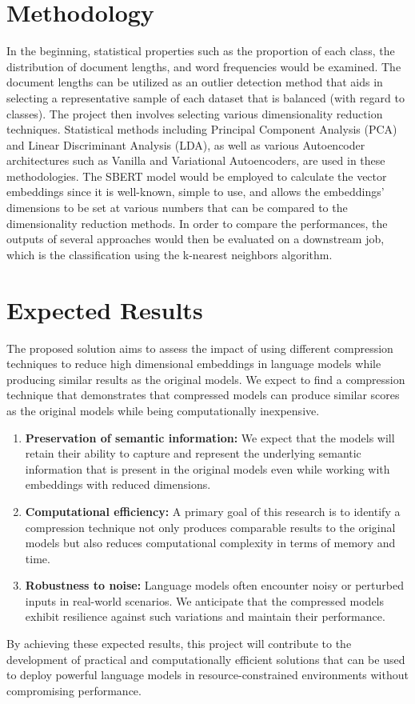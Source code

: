 \documentclass{article}
\begin{document}
\section{Methodology}
In the beginning, statistical properties such as the proportion of each class, the distribution of document lengths, and word frequencies would be examined. The document lengths can be utilized as an outlier detection method that aids in selecting a representative sample of each dataset that is balanced (with regard to classes). The project then involves selecting various dimensionality reduction techniques. Statistical methods including Principal Component Analysis (PCA) and Linear Discriminant Analysis (LDA), as well as various Autoencoder architectures such as Vanilla and Variational Autoencoders, are used in these methodologies. The SBERT model would be employed to calculate the vector embeddings since it is well-known, simple to use, and allows the embeddings' dimensions to be set at various numbers that can be compared to the dimensionality reduction methods. In order to compare the performances, the outputs of several approaches would then be evaluated on a downstream job, which is the classification using the k-nearest neighbors algorithm.

\section{Expected Results}
The proposed solution aims to assess the impact of using different compression techniques to reduce high dimensional embeddings in language models while producing similar results as the original models. We expect to find a compression technique that demonstrates that compressed models can produce similar scores as the original models while being computationally inexpensive. 
\begin{enumerate}
    \item \textbf{Preservation of semantic information:} We expect that the models will retain their ability to capture and represent the underlying semantic information that is present in the original models even while working with embeddings with reduced dimensions.
    \item \textbf{Computational efficiency:} A primary goal of this research is to identify a compression technique not only produces comparable results to the original models but also reduces computational complexity in terms of memory and time. 
    \item \textbf{Robustness to noise:}  Language models often encounter noisy or perturbed inputs in real-world scenarios. We anticipate that the compressed models exhibit resilience against such variations and maintain their performance.
\end{enumerate}
By achieving these expected results, this project will contribute to the development of practical and computationally efficient solutions that can be used to deploy powerful language models in resource-constrained environments without compromising performance.
\end{document}
